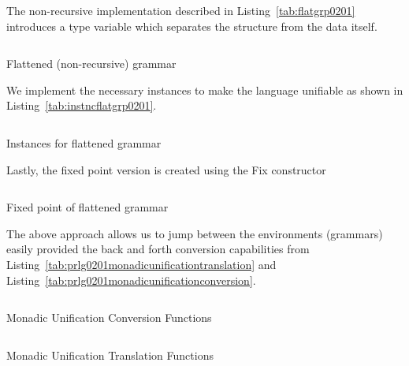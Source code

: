 \documentclass[thesis-solanki.tex]{subfiles}
\begin{document}
The non-recursive implementation described in Listing~\ref{tab:flatgrp0201} introduces a type variable which
separates the structure from the data itself.

\begin{code-list}[H]
  \begin{singlespace}
    \inputminted[linenos]{haskell}{haskell-proto2-flattened-rarefy.hs}
  \end{singlespace}
  \caption{Flattened (non-recursive) grammar}
\label{tab:flatgrp0201}
\end{code-list}

We implement the necessary instances to make the language unifiable as shown in Listing~\ref{tab:instncflatgrp0201}.
\begin{code-list}[H]
  \begin{singlespace}
    \inputminted[linenos,lastline=17]{haskell}{haskell-proto2-flattened-instances.hs}
  \end{singlespace}
  \caption{Instances for flattened grammar}
\label{tab:instncflatgrp0201}
\end{code-list}

Lastly, the fixed point version is created using the Fix constructor
\begin{code-list}[H]
  \begin{singlespace}
    \inputminted[linenos]{haskell}{haskell-proto2-fix-flattened.hs}
  \end{singlespace}
  \caption{Fixed point of flattened grammar}
\label{tab:fixflatgrp0201}
\end{code-list}

The above approach allows us to jump between the environments (grammars) easily provided the back and forth
conversion capabilities from Listing~\ref{tab:prlg0201monadicunificationtranslation} and
Listing~\ref{tab:prlg0201monadicunificationconversion}.

\begin{code-list}[H]
  \begin{singlespace}
    \inputminted[linenos]{haskell}{haskell-proto2-monadic-unification-conversion.hs}
  \end{singlespace}
\caption{ Monadic Unification Conversion Functions}
\label{tab:prlg0201monadicunificationconversion}
\end{code-list}

\begin{code-list}[H]
  \begin{singlespace}
    \inputminted[linenos,fontsize=\footnotesize]{haskell}{haskell-proto2-monadic-unification-translation.hs}
  \end{singlespace}
\caption{ Monadic Unification Translation Functions}
\label{tab:prlg0201monadicunificationtranslation}
\end{code-list}
\end{document}
